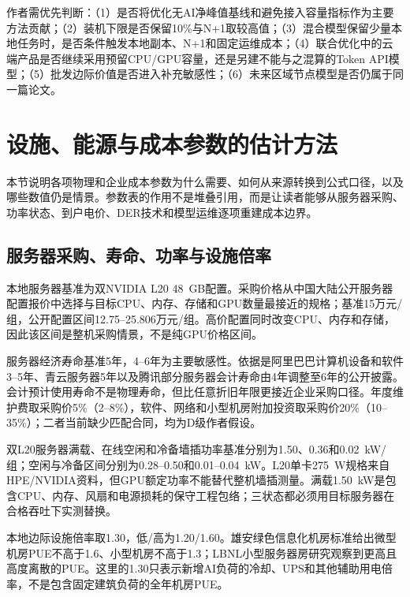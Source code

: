 \documentclass[preprint]{elsarticle}
\begin{document}
作者需优先判断：（1）是否将优化无AI净峰值基线和避免接入容量指标作为主要方法贡献；（2）装机下限是否保留10\%与N+1取较高值；（3）混合模型保留少量本地任务时，是否条件触发本地副本、N+1和固定运维成本；（4）联合优化中的云端产品是否继续采用预留CPU/GPU容量，还是另建不能与之混算的Token API模型；（5）批发边际价值是否进入补充敏感性；（6）未来区域节点模型是否仍属于同一篇论文。

\section{设施、能源与成本参数的估计方法}

本节说明各项物理和企业成本参数为什么需要、如何从来源转换到公式口径，以及哪些数值仍是情景。参数表的作用不是堆叠引用，而是让读者能够从服务器采购、功率状态、到户电价、DER技术和模型运维逐项重建成本边界。

\subsection{服务器采购、寿命、功率与设施倍率}

本地服务器基准为双NVIDIA L20 48~GB配置。采购价格从中国大陆公开服务器配置报价中选择与目标CPU、内存、存储和GPU数量最接近的规格；基准15万元/组，公开配置区间12.75--25.806万元/组\cite{lenovoL20}。高价配置同时改变CPU、内存和存储，因此该区间是整机采购情景，不是纯GPU价格区间。

服务器经济寿命基准5年，4--6年为主要敏感性。依据是阿里巴巴计算机设备和软件3--5年、青云服务器5年以及腾讯部分服务器会计寿命由4年调整至6年的公开披露。会计预计使用寿命不是物理寿命，但比任意折旧年限更接近企业采购口径。年度维护费取采购价5\%（2--8\%），软件、网络和小型机房附加投资取采购价20\%（10--35\%）；二者当前缺少匹配合同，均为D级作者假设。

双L20服务器满载、在线空闲和冷备墙插功率基准分别为1.50、0.36和0.02~kW/组；空闲与冷备区间分别为0.28--0.50和0.01--0.04~kW。L20单卡275~W规格来自HPE/NVIDIA资料，但GPU额定功率不能替代整机墙插测量\cite{hpeL20}。满载1.50~kW是包含CPU、内存、风扇和电源损耗的保守工程包络；三状态都必须用目标服务器在合格吞吐下实测替换。

本地边际设施倍率取1.30，低/高为1.20/1.60。雄安绿色信息化机房标准给出微型机房PUE不高于1.6、小型机房不高于1.3；LBNL小型服务器房研究观察到更高且高度离散的PUE\cite{xiongan2024,lbnlSmallRooms}。这里的1.30只表示新增AI负荷的冷却、UPS和其他辅助用电倍率，不是包含固定建筑负荷的全年机房PUE。
\end{document}
